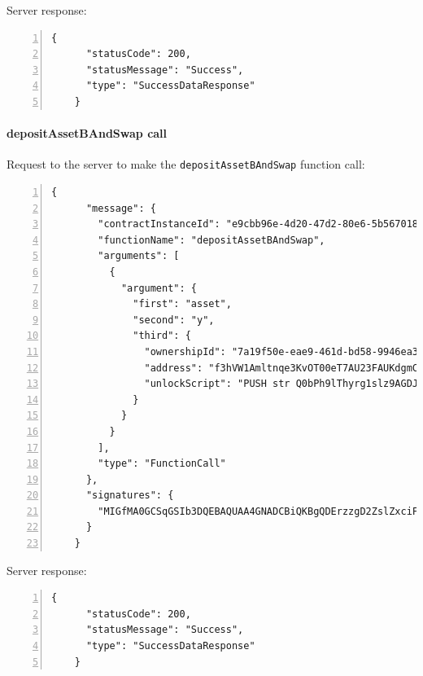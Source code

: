 Server response:
{
  \small
  \begin{Verbatim}[numbers=left,xleftmargin=1cm,firstnumber=1,breaklines=true,breakanywhere=true,tabsize=2]
    {
      "statusCode": 200,
      "statusMessage": "Success",
      "type": "SuccessDataResponse"
    }
  \end{Verbatim}
}

\paragraph{depositAssetBAndSwap call}

Request to the server to make the \verb|depositAssetBAndSwap| function call:
{
  \small
  \begin{Verbatim}[numbers=left,xleftmargin=1cm,firstnumber=1,breaklines=true,breakanywhere=true,tabsize=2]
    {
      "message": {
        "contractInstanceId": "e9cbb96e-4d20-47d2-80e6-5b56701800b1",
        "functionName": "depositAssetBAndSwap",
        "arguments": [
          {
            "argument": {
              "first": "asset",
              "second": "y",
              "third": {
                "ownershipId": "7a19f50e-eae9-461d-bd58-9946ea39ccf0",
                "address": "f3hVW1Amltnqe3KvOT00eT7AU23FAUKdgmCluZB+nss=",
                "unlockScript": "PUSH str Q0bPh9lThyrg1slz9AGDJDJh1BecN9SlGCeVe3BqLod+zO7q0wvIy8tLognHNBkR8e8zKo6nWGQ8qZ7egjOmm5BQsqZzt8xL3gBbR36vgk9J3G9ObiTR2Dd7hMqsqyJnLT3aZUPXGc6RZoM/iUFGJUXhq2T6DStvYNKuAH+Lfow=\nPUSH str MIGfMA0GCSqGSIb3DQEBAQUAA4GNADCBiQKBgQDErzzgD2ZslZxciFAiX3/ot7lrkZDw4148jFZrsDZPE6CVs9xXFSHGgy/mFvIFLXhnChO6Nyd2be3lbgeavLMCMVUiTStXr117Km17keWpb3sItkKKsLFBOcIIU8XXowI/OhzQN2XPZYESHgjdQ5vwEj2YyueiS7WKP94YWz/pswIDAQAB\n"
              }
            }
          }
        ],
        "type": "FunctionCall"
      },
      "signatures": {
        "MIGfMA0GCSqGSIb3DQEBAQUAA4GNADCBiQKBgQDErzzgD2ZslZxciFAiX3/ot7lrkZDw4148jFZrsDZPE6CVs9xXFSHGgy/mFvIFLXhnChO6Nyd2be3lbgeavLMCMVUiTStXr117Km17keWpb3sItkKKsLFBOcIIU8XXowI/OhzQN2XPZYESHgjdQ5vwEj2YyueiS7WKP94YWz/pswIDAQAB": "kh7JupouiEdeLuilXUdoJqAuPVx28JTg9dySp/ZNJGD5+XW8YhhIgiMJYOhGeN6DJTj/x+TmC96uyS8IwssUt/Hulnh2OAZzkc3FljWj1k/XfL0yye95u+YBxg+t8AddQBi+4uA4yOdzb8YdrONlzGu7t0roirmO8SbOqQR1uX8="
      }
    }
  \end{Verbatim}
}

Server response:
{
  \small
  \begin{Verbatim}[numbers=left,xleftmargin=1cm,firstnumber=1,breaklines=true,breakanywhere=true,tabsize=2]
    {
      "statusCode": 200,
      "statusMessage": "Success",
      "type": "SuccessDataResponse"
    }
  \end{Verbatim}
}

